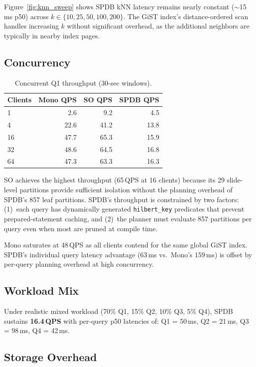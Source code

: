 \documentclass[10pt,twocolumn]{article}
\begin{document}
Figure~\ref{fig:knn_sweep} shows SPDB kNN latency remains nearly constant ($\sim$15\,ms p50) across $k \in \{10, 25, 50, 100, 200\}$.
The GiST index's distance-ordered scan handles increasing $k$ without significant overhead, as the additional neighbors are typically in nearby index pages.

\subsection{Concurrency}

\begin{table}[t]
\centering
\caption{Concurrent Q1 throughput (30-sec windows).}
\label{tab:throughput}
\begin{tabular}{@{}lrrr@{}}
\toprule
\textbf{Clients} & \textbf{Mono QPS} & \textbf{SO QPS} & \textbf{SPDB QPS} \\
\midrule
1 & 2.6 & 9.2 & 4.5 \\
4 & 22.6 & 41.2 & 13.8 \\
16 & 47.7 & 65.3 & 15.9 \\
32 & 48.6 & 64.5 & 16.8 \\
64 & 47.3 & 63.3 & 16.3 \\
\bottomrule
\end{tabular}
\end{table}

SO achieves the highest throughput (65\,QPS at 16 clients) because its 29 slide-level partitions provide sufficient isolation without the planning overhead of SPDB's 857 leaf partitions.
SPDB's throughput is constrained by two factors: (1)~each query has dynamically generated \texttt{hilbert\_key} predicates that prevent prepared-statement caching, and (2)~the planner must evaluate 857 partitions per query even when most are pruned at compile time.

Mono saturates at 48\,QPS as all clients contend for the same global GiST index.
SPDB's individual query latency advantage (63\,ms vs.\ Mono's 159\,ms) is offset by per-query planning overhead at high concurrency.

\subsection{Workload Mix}

Under realistic mixed workload (70\% Q1, 15\% Q2, 10\% Q3, 5\% Q4), SPDB sustains \textbf{16.4\,QPS} with per-query p50 latencies of: Q1 = 50\,ms, Q2 = 21\,ms, Q3 = 98\,ms, Q4 = 42\,ms.

\subsection{Storage Overhead}
\end{document}
